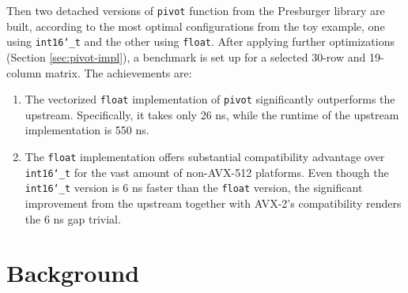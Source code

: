 \documentclass[logo,bsc,singlespacing,parskip]{infthesis}
\newcommand{\dtshort}{\texttt{int16\char`_t}}
\newcommand{\dtfloat}{\texttt{float}}
\newcommand{\pivot}{\texttt{pivot}}
\begin{document}
Then two detached versions of \texttt{pivot} function from the Presburger
library are built, according to the most optimal configurations from the toy
example, one using \dtshort{} and the other using \dtfloat{}. After applying 
further optimizations (Section \ref{sec:pivot-impl}), a benchmark is set up for a
selected 30-row and 19-column matrix. The achievements are: 
\begin{enumerate}
    \item The vectorized \dtfloat{} implementation of \pivot{} significantly
    outperforms the upstream. Specifically, it takes only 26 ns, while the
    runtime of the upstream implementation is 550 ns. 
    \item The \dtfloat{} implementation offers substantial compatibility
    advantage over \linebreak \dtshort{} for the vast amount of non-AVX-512
    platforms. Even though the \dtshort{} version is 6 ns faster than the
    \dtfloat{} version, the significant improvement from the upstream 
    together with AVX-2's compatibility
    renders the 6 ns gap trivial. 
\end{enumerate}


\chapter{Background}
\end{document}
